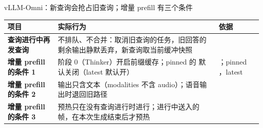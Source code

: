 \begin{frame}[t]{vLLM-Omni：新查询会抢占旧查询；增量 prefill 有三个条件}
\scriptsize
\renewcommand{\arraystretch}{1.1}
\setlength{\tabcolsep}{3pt}
\begin{tabularx}{\textwidth}{>{\bfseries}p{3.0cm} Y Y}
\toprule
{}
项目 & 实际行为 & 依据 \\
\midrule
查询进行中再发查询 & 不排队、不合并：取消旧查询的任务，旧回答的剩余输出静默丢弃，新查询取当前缓冲快照 &  \\
增量 prefill 的条件 1 & 阶段 0（Thinker）开启前缀缓存；pinned 的  默认关闭（latest 默认开） & ；pinned ，latest  \\
增量 prefill 的条件 2 & 输出只含文本（modalities 不含 audio）；语音输出时退回旧路径 &  \\
增量 prefill 的条件 3 & 预热只在没有查询进行时进行；进行中送入的帧，在本次生成结束后才预热 &  \\
\bottomrule
\end{tabularx}
\par{}
\par{}
\end{frame}

